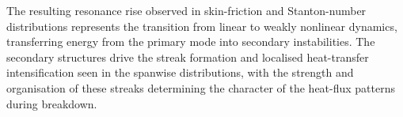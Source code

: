 The resulting resonance rise observed in skin-friction and Stanton-number distributions represents the transition from linear to weakly nonlinear dynamics, transferring energy from the primary mode into secondary instabilities. The secondary structures drive the streak formation \citep{Klebanoff} and localised heat-transfer intensification seen in the spanwise distributions, with the strength and organisation of these streaks determining the character of the heat-flux patterns during breakdown.


